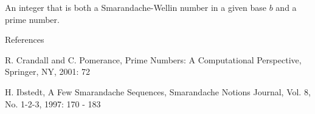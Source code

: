 \documentclass[12pt]{article}
\begin{document}
An integer that is both a Smarandache-Wellin number in a given base $b$ and a prime number.

References

R. Crandall and C. Pomerance, Prime Numbers: A Computational Perspective, Springer, NY, 2001: 72

H. Ibstedt, A Few Smarandache Sequences, Smarandache Notions Journal, Vol. 8, No. 1-2-3, 1997: 170 - 183
\end{document}
